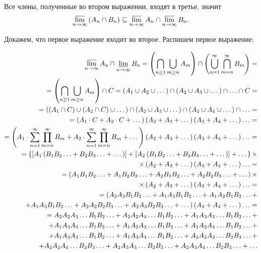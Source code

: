 \documentclass{book}
\begin{document}
Все члены, полученные во втором выражении, входят в третье, значит
$$\varlimsup\limits_{n\to\infty}\left(A_n\cap B_n\right)\subseteq
\varlimsup\limits_{n\to\infty}A_n\cap
\varlimsup\limits_{n\to\infty}B_n.$$

Докажем, что первое выражение входит во второе. Распишем первое выражение:

\begin{equation*}
\begin{split}
\varlimsup\limits_{n\to\infty}A_n\cap\varliminf\limits_{n\to\infty}B_n=
\left(\bigcap\limits_{n\geq 1}\bigcup\limits_{m\geq n}A_m\right)\cap
\left(\bigcup\limits_{n=1}^\infty\bigcap\limits_{m=n}^\infty B_m\right) = \\
= \left(\bigcap\limits_{n\geq 1}\bigcup\limits_{m\geq n}A_m\right)\cap C =
\left(A_1\cup A_2\cup \dotsc \right)\cap\left(A_2\cup A_3\cup \dotsc \right)\cap \dotsc \cap C = \\
= \left(\left(A_1\cap C\right)\cup\left(A_2\cap C\right)\cup \dotsc \right)\cap
\left(A_2\cup A_3\cup \dotsc \right)\cap\left(A_3\cup A_4\cup \dotsc \right)\cap \dotsc = \\
= \left( A_1 \cdot C+A_2 \cdot C+ \dotsc \right) \left( A_2+A_3+ \dotsc \right)
\left( A_3+A_4+ \dotsc \right) \dotsc = \\
= \left( A_1 \cdot \sum \limits_{n=1}^\infty \prod \limits_{m=n}^\infty B_m +
A_2 \cdot \sum \limits_{n=1}^\infty \prod \limits_{m=n}^\infty B_m + \dotsc \right)
\left( A_2 + A_3 + \dotsc \right) \left( A_3 + A_4 + \dotsc \right) \dotsc =  \\
= \left\{ \left[ A_1 \left( B_1 B_2 \dotsc +B_2 B_3 \dotsc + \dotsc \right) \right] +
\left[ A_2 \left( B_1 B_2 \dotsc +B_2 B_3 \dotsc + \dotsc \right) \right] + \dotsc \right\} \times \\
\times \left( A_2 + A_3 + \dotsc \right) \left( A_3+A_4+ \dotsc \right) \dotsc = \\
= \left( A_1 B_1 B_2 \dotsc + A_1 B_2 B_3 \dotsc + A_2 B_1 B_2 \dotsc + A_2 B_2 B_3 \dotsc + \dotsc \right) \times \\
\times \left( A_2 + A_3 + \dotsc \right) \left( A_3 + A_4 + \dotsc \right) \dotsc = \\
= ( A_2 A_2 B_1 B_2 \dotsc + A_1 A_3 B_1 B_2 \dotsc + A_1 A_2 B_1 B_2 \dotsc + \\
+ A_1 A_3 B_1 B_2 \dotsc + A_2 A_2 B_2 B_3 \dotsc + A_2 A_3 B_2 B_3 \dotsc + \dotsc )
\left( A_3 + A_4+ \dotsc \right) \dotsc = \\
= A_2 A_2 A_3 \dotsc B_1 B_2 \dotsc + A_2 A_2 A_4 \dotsc B_1 B_2 \dotsc + A_1 A_3 A_3 \dotsc B_1 B_2 \dotsc + \\
+ A_1 A_3 A_4 \dotsc B_1 B_2 \dotsc + A_1 A_2 A_3 \dotsc B_1 B_2 \dotsc + A_1 A_2 A_4 \dotsc B_1 B_2 \dotsc + \\
+ A_1 A_3 A_3 \dotsc B_1 B_2 \dotsc + A_1 A_3 A_4 \dotsc B_1 B_2 \dotsc + A_2 A_2 A_3 \dotsc B_2 B_3 \dotsc + \\
+ A_2 A_2 A_4 \dotsc B_2 B_3 \dotsc + A_2 A_3 A_3 \dotsc B_2 B_3 \dotsc + A_2 A_3 A_4 \dotsc B_2 B_3 \dotsc + \dotsc 
\end{split}
\end{equation*}
\end{document}
